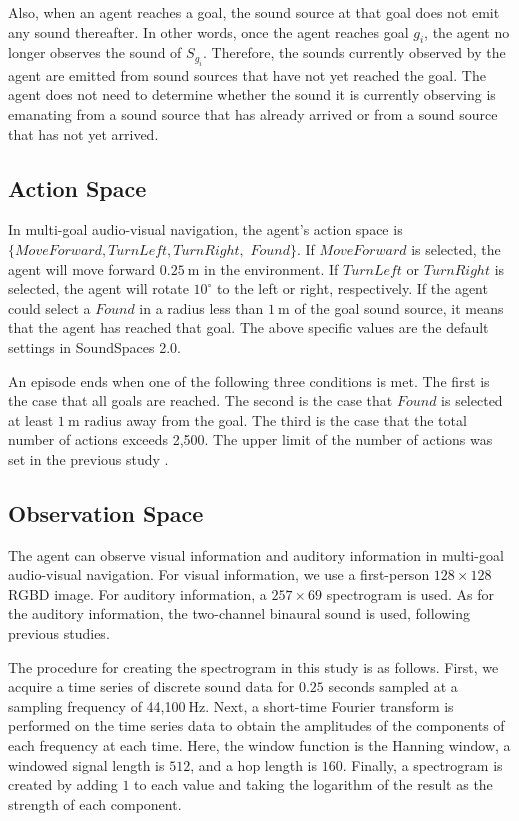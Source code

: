 Also, when an agent reaches a goal, the sound source at that goal does not emit any sound thereafter.
In other words, once the agent reaches goal $g_i$, the agent no longer observes the sound of $S_{g_i}$.
Therefore, the sounds currently observed by the agent are emitted from sound sources that have not yet reached the goal.
The agent does not need to determine whether the sound it is currently observing is emanating from a sound source that has already arrived or from a sound source that has not yet arrived.




\subsection{Action Space}

In multi-goal audio-visual navigation, the agent's action space is
$
\{MoveForward, TurnLeft, TurnRight,
$
$
Found\}.
$
If $MoveForward$ is selected, the agent will move forward $0.25\ \mathrm{m}$ in the environment.
If $TurnLeft$ or $TurnRight$ is selected, the agent will rotate $10^{\circ}$ to the left or right, respectively.
If the agent could select a $Found$ in a radius less than $1\ \mathrm{m}$ of the goal sound source, it means that the agent has reached that goal.
The above specific values are the default settings in SoundSpaces 2.0.

An episode ends when one of the following three conditions is met.
The first is the case that all goals are reached.
The second is the case that $Found$ is selected at least $1\ \mathrm{m}$ radius away from the goal.
The third is the case that the total number of actions exceeds 2,500.
The upper limit of the number of actions was set in the previous study \cite{wani2020multion}.

\subsection{Observation Space}

The agent can observe visual information and auditory information in multi-goal audio-visual navigation.
For visual information, we use a first-person $128 \times 128$ RGBD image.
For auditory information, a $257 \times 69$ spectrogram is used.
As for the auditory information, the two-channel binaural sound is used, following previous studies.

The procedure for creating the spectrogram in this study is as follows.
First, we acquire a time series of discrete sound data for $0.25$ seconds sampled at a sampling frequency of 44,100$\ \mathrm{Hz}$.
Next, a short-time Fourier transform is performed on the time series data to obtain the amplitudes of the components of each frequency at each time.
Here, the window function is the Hanning window, a windowed signal length is $512$, and a hop length is $160$.
Finally, a spectrogram is created by adding $1$ to each value and taking the logarithm of the result as the strength of each component.


